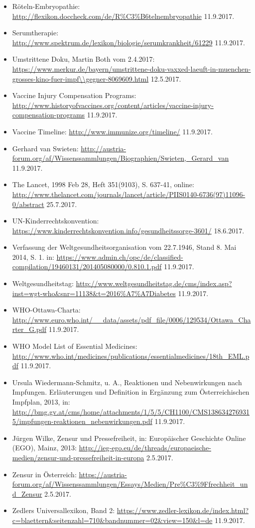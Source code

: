 \documentclass[
    a4paper,
    12pt,
    hyphens,
    chapterprefix=true,
    headheight=33pt,
    footheight=29pt,
    headings=optiontohead, %
]{scrartcl}
\begin{document}
{\begin{itemize}
\item{Röteln-Embryopathie: \url{http://flexikon.doccheck.com/de/R\%C3\%B6telnembryopathie} 11.9.2017.}
\item{Serumtherapie: \url{http://www.spektrum.de/lexikon/biologie/serumkrankheit/61229} 11.9.2017.}
\item{Umstrittene Doku, Martin Both vom 2.4.2017: \url{https://www.merkur.de/bayern/umstrittene-doku-vaxxed-laeuft-in-muenchen-grosses-kino-fuer-impf\\gegner-8069609.html} 12.5.2017.}
\item{Vaccine Injury Compensation Programs: \url{http://www.historyofvaccines.org/content/articles/vaccine-injury-compensation-programs} 11.9.2017.}
\item{Vaccine Timeline: \url{http://www.immunize.org/timeline/} 11.9.2017.}
\item{Gerhard van Swieten: \url{http://austria-forum.org/af/Wissenssammlungen/Biographien/Swieten,_Gerard_van} 11.9.2017.}
\item{The Lancet, 1998 Feb 28, Heft 351(9103), S. 637-41, online: \url{http://www.thelancet.com/journals/lancet/article/PIIS0140-6736(97)11096-0/abstract} 25.7.2017.}
\item{UN-Kinderrechtskonvention: \url{https://www.kinderrechtskonvention.info/gesundheitssorge-3601/} 18.6.2017.}
\item{Verfassung der Weltgesundheitsorganisation vom 22.7.1946, Stand 8. Mai 2014, S. 1. in: \url{https://www.admin.ch/opc/de/classified-compilation/19460131/201405080000/0.810.1.pdf} 11.9.2017.}
\item{Weltgesundheitstag: \url{http://www.weltgesundheitstag.de/cms/index.asp?inst=wgt-who&snr=11138&t=2016\%A7\%A7Diabetes} 11.9.2017.}
\item{WHO-Ottawa-Charta: \url{http://www.euro.who.int/__data/assets/pdf_file/0006/129534/Ottawa_Charter_G.pdf} 11.9.2017.}
\item{WHO Model List of Essential Medicines: \url{http://www.who.int/medicines/publications/essentialmedicines/18th_EML.pdf} 11.9.2017.}
\item{Ursula Wiedermann-Schmitz, u. A., Reaktionen und Nebenwirkungen nach Impfungen. Erläuterungen und Definition in Ergänzung zum Österreichischen Impfplan, 2013, in: \url{http://bmg.gv.at/cms/home/attachments/1/5/5/CH1100/CMS1386342769315/impfungen-reaktionen_nebenwirkungen.pdf} 11.9.2017.}
\item{Jürgen Wilke, Zensur und Pressefreiheit, in: Europäischer Geschichte Online (EGO), Mainz, 2013: \url{http://ieg-ego.eu/de/threads/europaeische-medien/zensur-und-pressefreiheit-in-europa} 2.5.2017.}
\item{Zensur in Österreich: \url{https://austria-forum.org/af/Wissenssammlungen/Essays/Medien/Pre\%C3\%9Ffrechheit_und_Zensur} 2.5.2017.}
\item{Zedlers Universallexikon, Band 2: \url{https://www.zedler-lexikon.de/index.html?c=blaettern&seitenzahl=710&bandnummer=02&view=150&l=de} 11.9.2017.}
\end{itemize}


}
\end{document}
